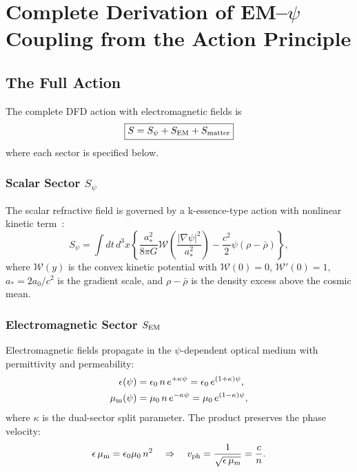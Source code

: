 \documentclass[aps,prd,twocolumn,superscriptaddress,floatfix,nofootinbib]{revtex4-2}
\newcommand{\astar}{a_*}
\newcommand{\Wfunc}{\mathcal{W}}
\newcommand{\kap}{\kappa}
\begin{document}
\section{Complete Derivation of EM--$\psi$ Coupling from the Action
Principle}\label{sec:derivation}

\subsection{The Full Action}\label{sec:full-action}

The complete DFD action with electromagnetic fields is
\begin{equation}
\boxed{S = S_\psi + S_{\rm EM} + S_{\rm matter}}
\label{eq:full-action}
\end{equation}
where each sector is specified below.

\subsubsection{Scalar Sector $S_\psi$}

The scalar refractive field is governed by a k-essence-type action with
nonlinear kinetic term~\cite{Alcock2025DFD}:
\begin{equation}
S_\psi = \int dt\,d^3x\left\{
  \frac{\astar^2}{8\pi G}\Wfunc\!\left(\frac{|\nabla\psi|^2}{\astar^2}\right)
  - \frac{c^2}{2}\psi(\rho - \bar{\rho})
\right\},
\label{eq:S-psi}
\end{equation}
where $\Wfunc(y)$ is the convex kinetic potential with $\Wfunc(0)=0$,
$\Wfunc'(0)=1$, $\astar = 2a_0/c^2$ is the gradient scale, and
$\rho - \bar{\rho}$ is the density excess above the cosmic mean.

\subsubsection{Electromagnetic Sector $S_{\rm EM}$}

Electromagnetic fields propagate in the $\psi$-dependent optical medium
with permittivity and permeability:
\begin{align}
\epsilon(\psi) &= \epsilon_0\,n\,e^{+\kap\psi}
= \epsilon_0\,e^{(1+\kap)\psi}, \label{eq:eps}\\
\mu_{\rm m}(\psi) &= \mu_0\,n\,e^{-\kap\psi}
= \mu_0\,e^{(1-\kap)\psi}, \label{eq:mum}
\end{align}
where $\kap$ is the dual-sector split parameter. The product preserves
the phase velocity:
\begin{equation}
\epsilon\,\mu_{\rm m} = \epsilon_0\mu_0\,n^2
\quad\Rightarrow\quad v_{\rm ph} = \frac{1}{\sqrt{\epsilon\,\mu_{\rm m}}}
= \frac{c}{n}.
\end{equation}
\end{document}
